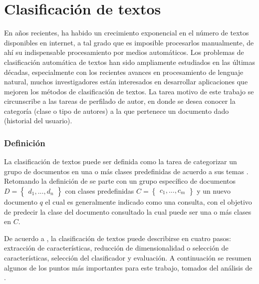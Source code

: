 \section{Clasificación de textos}

En años recientes, ha habido un crecimiento exponencial en el número de textos disponibles en internet, a tal grado que es imposible procesarlos  manualmente, de ahí su indispensable procesamiento por medios automáticos. Los problemas de clasificación automática de textos han sido ampliamente estudiados en las últimas décadas, especialmente con los recientes avances en procesamiento de lenguaje natural, muchos investigadores están interesados en desarrollar aplicaciones que mejoren los métodos de clasificación de textos. La tarea motivo de este trabajo se circunscribe a las tareas de perfilado de autor, en donde se desea conocer la categoría (clase o tipo de autores) a la que pertenece un documento dado (historial del usuario).

\subsubsection{Definición}

La clasificación de textos puede ser definida como la tarea de categorizar un grupo de documentos en una o más clases predefinidas de acuerdo a sus temas \citep{Kadhim2019}. Retomando la definición de \citep{Kadhim2019} se parte con un grupo específico de documentos  $D={\begin{Bmatrix} d_1 , ... , d_n \end{Bmatrix}}$ con clases predefinidas $C={\begin{Bmatrix} c_1 , ... , c_m \end{Bmatrix}}$ y un nuevo documento $q$ el cual es generalmente indicado como una consulta,  con el objetivo de predecir la  clase del documento consultado la cual puede ser una o más clases en $C$.

 
De acuerdo a \citep{kowsari2019text}, la clasificación de textos puede describirse en cuatro pasos: extracción de características, reducción de dimensionalidad o selección de características, selección del clasificador y evaluación. A continuación  se resumen algunos de los puntos más importantes para este trabajo, tomados del análisis de \citep{kowsari2019text}.

